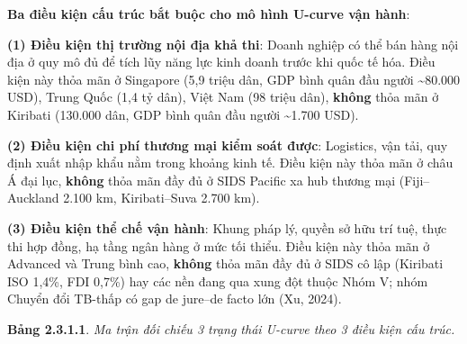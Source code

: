 \documentclass[
  a4paper,
  13pt]{extreport}
\begin{document}
\textbf{Ba điều kiện cấu trúc bắt buộc cho mô hình U-curve vận hành}:

\textbf{(1) Điều kiện thị trường nội địa khả thi}: Doanh nghiệp có thể
bán hàng nội địa ở quy mô đủ để tích lũy năng lực kinh doanh trước khi
quốc tế hóa. Điều kiện này thỏa mãn ở Singapore (5,9 triệu dân, GDP bình
quân đầu người \textasciitilde80.000 USD), Trung Quốc (1,4 tỷ dân), Việt
Nam (98 triệu dân), \textbf{không} thỏa mãn ở Kiribati (130.000 dân, GDP
bình quân đầu người \textasciitilde1.700 USD).

\textbf{(2) Điều kiện chi phí thương mại kiểm soát được}: Logistics, vận
tải, quy định xuất nhập khẩu nằm trong khoảng kinh tế. Điều kiện này
thỏa mãn ở châu Á đại lục, \textbf{không} thỏa mãn đầy đủ ở SIDS Pacific
xa hub thương mại (Fiji--Auckland 2.100 km, Kiribati--Suva 2.700 km).

\textbf{(3) Điều kiện thể chế vận hành}: Khung pháp lý, quyền sở hữu trí
tuệ, thực thi hợp đồng, hạ tầng ngân hàng ở mức tối thiểu. Điều kiện này
thỏa mãn ở Advanced và Trung bình cao, \textbf{không} thỏa mãn đầy đủ ở
SIDS cô lập (Kiribati ISO 1,4\%, FDI 0,7\%) hay các nền đang qua xung
đột thuộc Nhóm V; nhóm Chuyển đổi TB-thấp có gap de jure--de facto lớn
(Xu, 2024).

\textbf{Bảng 2.3.1.1}. \emph{Ma trận đối chiếu 3 trạng thái U-curve theo
3 điều kiện cấu trúc.}
\end{document}
